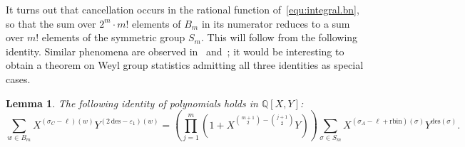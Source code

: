 \documentclass[11pt,a4paper]{amsart}
\theoremstyle{plain}
\newtheorem{lem}[thm]{Lemma}
\theoremstyle{remark}
\newcommand{\Q}{\mathbb{Q}}
\begin{document}
It turns out that cancellation occurs in the rational function
of~\eqref{equ:integral.bn}, so that the sum over $2^m \cdot m!$ elements of $B_m$ in its numerator reduces to a sum over $m!$ elements of the symmetric group $S_m$.  This will follow from the following identity.  Similar phenomena are observed in~\cite[Proposition~1.7]{StasinskiVoll/14} and~\cite[Proposition~3.4]{CSV/18}; it would be interesting to obtain a theorem on Weyl group statistics admitting all three identities as special cases.

\begin{lem} \label{lem:bm.to.sm}
The following identity of polynomials holds in $\Q[X,Y]$:
\begin{equation*}
\sum_{w \in B_m} X^{(\sigma_C - \ell)(w)} Y^{(2 \,\mathrm{des} - \varepsilon_1)(w)} = \! \left( \prod_{j = 1}^m (1 + X^{\binom{m+1}{2} - \binom{j+1}{2}} Y) \right) \! \sum_{\sigma \in S_m} X^{(\sigma_A - \ell + \mathrm{rbin})(\sigma)} Y^{\mathrm{des}(\sigma)}.
\end{equation*}
\end{lem}
\end{document}
